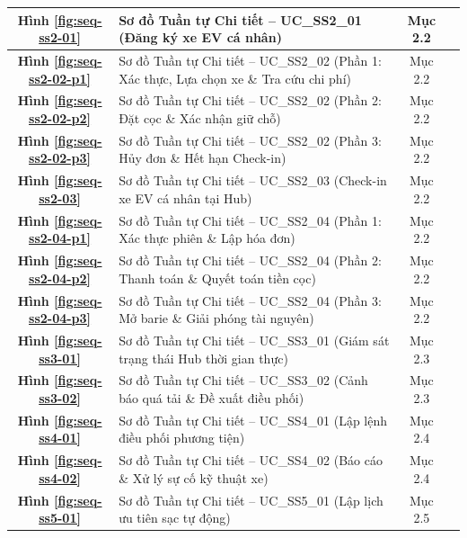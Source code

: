 \documentclass[12pt,a4paper]{article}
\begin{document}
\begin{longtable}{|c|p{8.5cm}|c|c|}
    \hline
    \textbf{Hình \ref{fig:seq-ss2-01}} & Sơ đồ Tuần tự Chi tiết -- UC\_SS2\_01 (Đăng ký xe EV cá nhân) & Mục 2.2 & \pageref{fig:seq-ss2-01} \\
    \hline
    \textbf{Hình \ref{fig:seq-ss2-02-p1}} & Sơ đồ Tuần tự Chi tiết -- UC\_SS2\_02 (Phần 1: Xác thực, Lựa chọn xe \& Tra cứu chi phí) & Mục 2.2 & \pageref{fig:seq-ss2-02-p1} \\
    \hline
    \textbf{Hình \ref{fig:seq-ss2-02-p2}} & Sơ đồ Tuần tự Chi tiết -- UC\_SS2\_02 (Phần 2: Đặt cọc \& Xác nhận giữ chỗ) & Mục 2.2 & \pageref{fig:seq-ss2-02-p2} \\
    \hline
    \textbf{Hình \ref{fig:seq-ss2-02-p3}} & Sơ đồ Tuần tự Chi tiết -- UC\_SS2\_02 (Phần 3: Hủy đơn \& Hết hạn Check-in) & Mục 2.2 & \pageref{fig:seq-ss2-02-p3} \\
    \hline
    \textbf{Hình \ref{fig:seq-ss2-03}} & Sơ đồ Tuần tự Chi tiết -- UC\_SS2\_03 (Check-in xe EV cá nhân tại Hub) & Mục 2.2 & \pageref{fig:seq-ss2-03} \\
    \hline
    \textbf{Hình \ref{fig:seq-ss2-04-p1}} & Sơ đồ Tuần tự Chi tiết -- UC\_SS2\_04 (Phần 1: Xác thực phiên \& Lập hóa đơn) & Mục 2.2 & \pageref{fig:seq-ss2-04-p1} \\
    \hline
    \textbf{Hình \ref{fig:seq-ss2-04-p2}} & Sơ đồ Tuần tự Chi tiết -- UC\_SS2\_04 (Phần 2: Thanh toán \& Quyết toán tiền cọc) & Mục 2.2 & \pageref{fig:seq-ss2-04-p2} \\
    \hline
    \textbf{Hình \ref{fig:seq-ss2-04-p3}} & Sơ đồ Tuần tự Chi tiết -- UC\_SS2\_04 (Phần 3: Mở barie \& Giải phóng tài nguyên) & Mục 2.2 & \pageref{fig:seq-ss2-04-p3} \\
    \hline
    \textbf{Hình \ref{fig:seq-ss3-01}} & Sơ đồ Tuần tự Chi tiết -- UC\_SS3\_01 (Giám sát trạng thái Hub thời gian thực) & Mục 2.3 & \pageref{fig:seq-ss3-01} \\
    \hline
    \textbf{Hình \ref{fig:seq-ss3-02}} & Sơ đồ Tuần tự Chi tiết -- UC\_SS3\_02 (Cảnh báo quá tải \& Đề xuất điều phối) & Mục 2.3 & \pageref{fig:seq-ss3-02} \\
    \hline
    \textbf{Hình \ref{fig:seq-ss4-01}} & Sơ đồ Tuần tự Chi tiết -- UC\_SS4\_01 (Lập lệnh điều phối phương tiện) & Mục 2.4 & \pageref{fig:seq-ss4-01} \\
    \hline
    \textbf{Hình \ref{fig:seq-ss4-02}} & Sơ đồ Tuần tự Chi tiết -- UC\_SS4\_02 (Báo cáo \& Xử lý sự cố kỹ thuật xe) & Mục 2.4 & \pageref{fig:seq-ss4-02} \\
    \hline
    \textbf{Hình \ref{fig:seq-ss5-01}} & Sơ đồ Tuần tự Chi tiết -- UC\_SS5\_01 (Lập lịch ưu tiên sạc tự động) & Mục 2.5 & \pageref{fig:seq-ss5-01} \\

\end{longtable}
\end{document}
